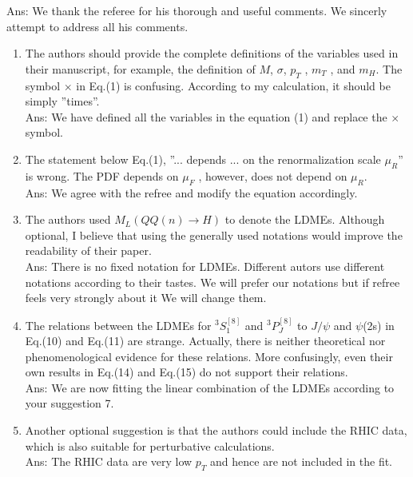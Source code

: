 \documentclass[aps,prc,preprint,superscriptaddress,showpacs,showkeys,amsmath]{revtex4-1}
\begin{document}
Ans: We thank the referee for his thorough and useful comments. We sincerly attempt
to address all his comments.


\begin{enumerate}

\item The authors should provide the complete definitions of the variables used in their
manuscript, for example, the definition of $M$, $\sigma$, $p_T$ , $m_T$ , and $m_H$. 
The symbol $\times$ in Eq.(1) is confusing. According to my calculation, it should be 
simply ”times”.\\
{\color{blue}
Ans: We have defined all the variables in the equation (1) and replace the $\times$
symbol. 
}
\item The statement below Eq.(1), ”... depends ... on the renormalization scale $\mu_R$” 
is wrong. The PDF depends on $\mu_F$ , however, does not depend on $\mu_R$. \\
{\color{blue}
Ans: We agree with the refree and modify the equation accordingly.
}
\item The authors used $M_L(QQ(n) \rightarrow H)$ to denote the LDMEs. Although optional, 
I believe that using the generally used notations would improve the readability of 
their paper. \\
{\color{blue}
Ans: There is no fixed notation for LDMEs. Different autors use different notations according to
their tastes. We will prefer our notations but if refree feels very strongly about it We will 
change them. 
}

\item The relations between the LDMEs for $^3S_1^{[8]}$ and $^3P^{[8]}_J$ to $J/\psi$  
and  $\psi$(2s) in Eq.(10) and Eq.(11) are strange. Actually, there is neither 
theoretical nor phenomenological evidence for these relations. More confusingly, 
even their own results in Eq.(14) and Eq.(15) do not support their relations.\\
{\color{blue}
Ans: We are now fitting the linear combination of the LDMEs according to your suggestion
7.
}
\item Another optional suggestion is that the authors could include the RHIC data, 
  which is also suitable for perturbative calculations.\\
  {\color{blue}
    Ans: The RHIC data are very low $p_{T}$ and hence are not included in the fit.
  }


\end{enumerate}
\end{document}
